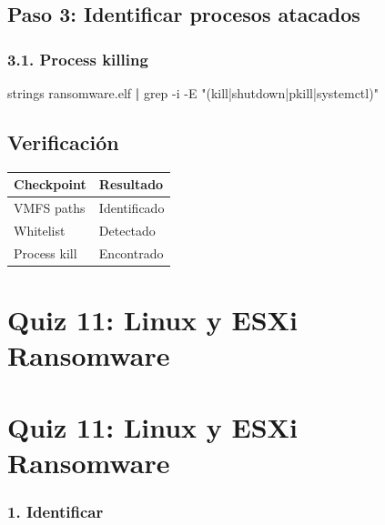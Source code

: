 \documentclass[
  letterpaper,
]{report}
\newenvironment{Shaded}{\begin{snugshade}}{\end{snugshade}}
\newcommand{\AttributeTok}[1]{\textcolor[rgb]{0.40,0.45,0.13}{#1}}
\newcommand{\FunctionTok}[1]{\textcolor[rgb]{0.28,0.35,0.67}{#1}}
\newcommand{\KeywordTok}[1]{\textcolor[rgb]{0.00,0.23,0.31}{\textbf{#1}}}
\newcommand{\NormalTok}[1]{\textcolor[rgb]{0.00,0.23,0.31}{#1}}
\newcommand{\StringTok}[1]{\textcolor[rgb]{0.13,0.47,0.30}{#1}}
\newcounter{none} %
\begin{document}
\section{Paso 3: Identificar procesos
atacados}\label{paso-3-identificar-procesos-atacados}

\subsection{3.1. Process killing}\label{process-killing}

\begin{Shaded}
\begin{Highlighting}[]
\FunctionTok{strings}\NormalTok{ ransomware.elf }\KeywordTok{|} \FunctionTok{grep} \AttributeTok{{-}i} \AttributeTok{{-}E} \StringTok{"(kill|shutdown|pkill|systemctl)"}
\end{Highlighting}
\end{Shaded}

\section{Verificación}\label{verificaciuxf3n-9}

{\def\LTcaptype{none} %
\begin{longtable}[]{@{}ll@{}}
\toprule\noalign{}
Checkpoint & Resultado \\
\midrule\noalign{}
\endhead
\bottomrule\noalign{}
\endlastfoot
VMFS paths & Identificado \\
Whitelist & Detectado \\
Process kill & Encontrado \\
\end{longtable}
}

\chapter{Quiz 11: Linux y ESXi
Ransomware}\label{quiz-11-linux-y-esxi-ransomware}

\chapter{Quiz 11: Linux y ESXi
Ransomware}\label{quiz-11-linux-y-esxi-ransomware-1}

\subsection{1. Identificar}\label{identificar-6}
\end{document}
